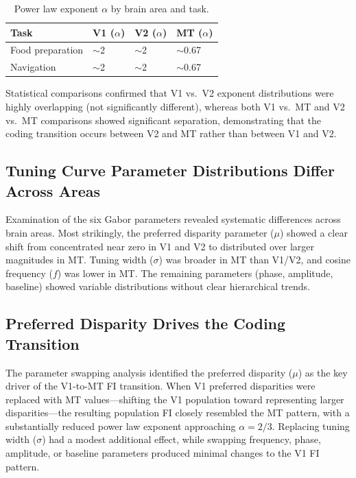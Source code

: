 \documentclass[12pt]{article}
\begin{document}
\begin{table}[ht]
\centering
\caption{Power law exponent $\alpha$ by brain area and task.}
\label{tab:alpha}
\begin{tabular}{llll}
\toprule
Task & V1 ($\alpha$) & V2 ($\alpha$) & MT ($\alpha$) \\
\midrule
Food preparation & $\sim$2 & $\sim$2 & $\sim$0.67 \\
Navigation & $\sim$2 & $\sim$2 & $\sim$0.67 \\
\bottomrule
\end{tabular}
\end{table}

Statistical comparisons confirmed that V1 vs.\ V2 exponent distributions were highly overlapping (not significantly different), whereas both V1 vs.\ MT and V2 vs.\ MT comparisons showed significant separation, demonstrating that the coding transition occurs between V2 and MT rather than between V1 and V2.

\subsection{Tuning Curve Parameter Distributions Differ Across Areas}

Examination of the six Gabor parameters revealed systematic differences across brain areas. Most strikingly, the preferred disparity parameter ($\mu$) showed a clear shift from concentrated near zero in V1 and V2 to distributed over larger magnitudes in MT. Tuning width ($\sigma$) was broader in MT than V1/V2, and cosine frequency ($f$) was lower in MT. The remaining parameters (phase, amplitude, baseline) showed variable distributions without clear hierarchical trends.

\subsection{Preferred Disparity Drives the Coding Transition}

The parameter swapping analysis identified the preferred disparity ($\mu$) as the key driver of the V1-to-MT FI transition. When V1 preferred disparities were replaced with MT values---shifting the V1 population toward representing larger disparities---the resulting population FI closely resembled the MT pattern, with a substantially reduced power law exponent approaching $\alpha = 2/3$. Replacing tuning width ($\sigma$) had a modest additional effect, while swapping frequency, phase, amplitude, or baseline parameters produced minimal changes to the V1 FI pattern.
\end{document}
